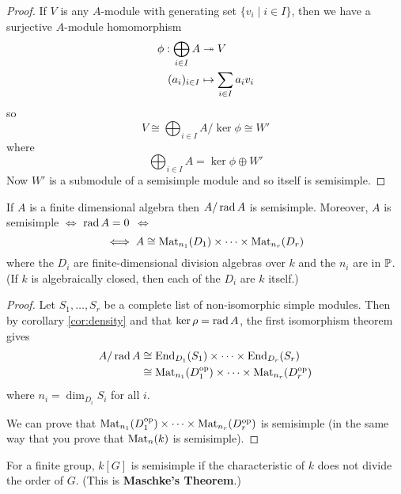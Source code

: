 \begin{proof}
	If $V$ is any $A$-module with generating set $\{v_i \mid i \in I\}$, then we have a surjective $A$-module homomorphism
    \begin{align*}
   		\phi: \bigoplus_{i \in I} A &\twoheadrightarrow V \\
        (a_i)_{i \in I} &\mapsto \sum_{i \in I} a_iv_i
    \end{align*}
    so
    \[V \cong \bigoplus_{i \in I} A/\ker\phi \cong W'\]
    where
    \[\bigoplus_{i \in I} A = \ker\phi \oplus W'\]
    Now $W'$ is a submodule of a semisimple module and so itself is semisimple.
\end{proof}

\begin{thm}
	If $A$ is a finite dimensional algebra then $A/\operatorname{rad} A$ is semisimple.
    Moreover, $A$ is semisimple $\iff$ $\operatorname{rad} A = 0$ $\iff$
    \[\iff A \cong \operatorname{Mat}_{n_1}(D_1) \times \cdots \times \operatorname{Mat}_{n_r}(D_r)\]
    where the $D_i$ are finite-dimensional division algebras over $k$ and the $n_i$ are in $\mathbb{P}$.
    (If $k$ is algebraically closed, then each of the $D_i$ are $k$ itself.)
\end{thm}

\begin{proof}
	Let $S_1,\ldots,S_r$ be a complete list of non-isomorphic simple modules.
    Then by corollary \ref{cor:density} and that $\ker\rho = \operatorname{rad} A$, the first isomorphism theorem gives
    \begin{align*}
    	A/\operatorname{rad} A &\cong \operatorname{End}_{D_1}(S_1) \times \cdots \times \operatorname{End}_{D_r}(S_r) \\
        &\cong \operatorname{Mat}_{n_1}(D_1^{\operatorname{op}}) \times \cdots \times \operatorname{Mat}_{n_r}(D_r^{\operatorname{op}})
    \end{align*}
    where $n_i = \dim_{D_i} S_i$ for all $i$.

	We can prove that $\operatorname{Mat}_{n_1}(D_1^{\operatorname{op}}) \times \cdots \times \operatorname{Mat}_{n_r}(D_r^{\operatorname{op}})$ is semisimple (in the same way that you prove that $\operatorname{Mat}_n(k)$ is semisimple).
\end{proof}

\begin{rmk}
	For a finite group, $k[G]$ is semisimple if the characteristic of $k$ does not divide the order of $G$.
    (This is \textbf{Maschke's Theorem}.)
\end{rmk}
